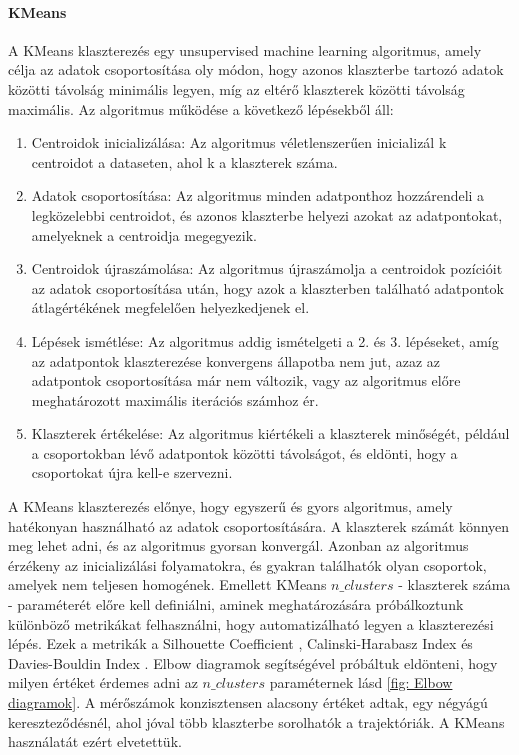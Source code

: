 \documentclass[12pt,a4paper]{article}
\begin{document}
\paragraph{KMeans} A KMeans klaszterezés egy unsupervised machine learning algoritmus, amely célja az adatok csoportosítása oly módon, hogy azonos klaszterbe tartozó adatok közötti távolság minimális legyen, míg az eltérő klaszterek közötti távolság maximális.
Az algoritmus működése a következő lépésekből áll:
\begin{enumerate}
    \item Centroidok inicializálása: Az algoritmus véletlenszerűen inicializál k centroidot a dataseten, ahol k a klaszterek száma.
    \item Adatok csoportosítása: Az algoritmus minden adatponthoz hozzárendeli a legközelebbi centroidot, és azonos klaszterbe helyezi azokat az adatpontokat, amelyeknek a centroidja megegyezik.
    \item Centroidok újraszámolása: Az algoritmus újraszámolja a centroidok pozícióit az adatok csoportosítása után, hogy azok a klaszterben található adatpontok átlagértékének megfelelően helyezkedjenek el.
    \item Lépések ismétlése: Az algoritmus addig ismételgeti a 2. és 3. lépéseket, amíg az adatpontok klaszterezése konvergens állapotba nem jut, azaz az adatpontok csoportosítása már nem változik, vagy az algoritmus előre meghatározott maximális iterációs számhoz ér.
    \item Klaszterek értékelése: Az algoritmus kiértékeli a klaszterek minőségét, például a csoportokban lévő adatpontok közötti távolságot, és eldönti, hogy a csoportokat újra kell-e szervezni.
\end{enumerate}
A KMeans klaszterezés előnye, hogy egyszerű és gyors algoritmus, amely hatékonyan használható az adatok csoportosítására. A klaszterek számát könnyen meg lehet adni, és az algoritmus gyorsan konvergál. Azonban az algoritmus érzékeny az inicializálási folyamatokra, és gyakran találhatók olyan csoportok, amelyek nem teljesen homogének.
Emellett KMeans $n\_clusters$ - klaszterek száma - paraméterét előre kell definiálni, aminek meghatározására próbálkoztunk különböző metrikákat felhasználni, hogy automatizálható legyen
a klaszterezési lépés. Ezek a metrikák a Silhouette Coefficient \cite{ROUSSEEUW198753}, Calinski-Harabasz Index \cite{10.1080/03610927408827101} és Davies-Bouldin Index \cite{4766909}.
Elbow diagramok segítségével próbáltuk eldönteni, hogy milyen értéket érdemes adni az \begin{math}n\_clusters\end{math} paraméternek lásd \ref{fig: Elbow diagramok}.
A mérőszámok konzisztensen alacsony értéket adtak, egy négyágú kereszteződésnél, ahol jóval több klaszterbe sorolhatók a trajektóriák. A KMeans használatát
ezért elvetettük.
\end{document}
